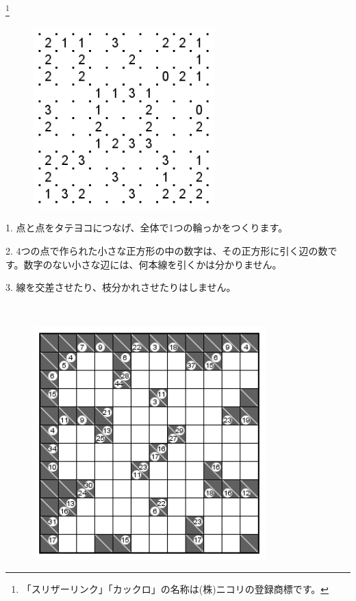 \footnote{「スリザーリンク」「カックロ」の名称は(株)ニコリの登録商標です。}
\leavevmode \\
\begin{figure}[H]
\centering  %
\includegraphics[width =7cm,bb = 0 0 202 202]{sp1slitherlink1.png}
\end{figure}
\begin{description}
\item{1.} 点と点をタテヨコにつなげ、全体で1つの輪っかをつくります。
\item{2.}  4つの点で作られた小さな正方形の中の数字は、その正方形に引く辺の数です。数字のない小さな辺には、何本線を引くかは分かりません。
\item{3.} 線を交差させたり、枝分かれさせたりはしません。
\end{description}
\newpage
{}
\leavevmode \\
\begin{figure}[H]
\centering  %
\includegraphics[width = 9cm,bb = 0 0 240 240]{sp1kakkuro1.png}
\end{figure}

